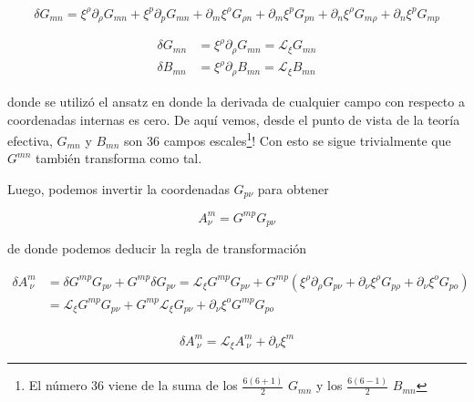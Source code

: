 \documentclass{article}
\numberwithin{equation}{section}
\begin{document}
\begin{equation*}
\delta G_{m n} = \xi^{\rho} \partial_{\rho} G_{m n} + \xi^p \partial_p G_{m n} + \partial_m \xi^{\rho} G_{\rho n} + \partial_m \xi^p G_{p n} + \partial_n \xi^{\rho} G_{m \rho} + \partial_n \xi^p G_{m p}
\end{equation*}
\begin{boxquation}
\begin{equation}\label{GyBscalars}
\begin{aligned}
\delta G_{m n} &= \xi^{\rho} \partial_{\rho} G_{m n} = \mathcal{L}_{\xi} G_{m n}\\
\delta B_{m n} &= \xi^{\rho} \partial_{\rho} B_{m n} = \mathcal{L}_{\xi} B_{m n}
\end{aligned}
\end{equation}
\end{boxquation}

donde se utilizó el ansatz en donde la derivada de cualquier campo con respecto a coordenadas internas es cero. De aquí vemos, desde el punto de vista de la teoría efectiva, $ G_{m n} $ y $ B_{m n} $ son 36 campos escales\footnote{ El número 36 viene de la suma de los $ \frac{6(6+1)}{2} $ $ G_{m n} $ y los $ \frac{6(6-1)}{2} $ $ B_{m n} $}! Con esto se sigue trivialmente que $ G^{m n} $ también transforma como tal.

Luego, podemos invertir la coordenadas $ G_{p \nu} $ para obtener

\begin{equation}
A^m_{\nu} = G^{m p} G_{p \nu}
\end{equation}

de donde podemos deducir la regla de transformación 

\begin{equation*}
\begin{aligned}
\delta A^m_{\ \nu} &= \delta G^{m p} G_{p \nu} + G^{m p} \delta G_{p \nu} = \mathcal{L}_{\xi} G^{m p} G_{p \nu} + G^{m p} \left( \xi^{\rho} \partial_{\rho} G_{p \nu} + \partial_{\nu} \xi^{\rho} G_{p \rho} + \partial_{\nu} \xi^{o} G_{p o} \right)\\
&=\mathcal{L}_{\xi} G^{m p} G_{p \nu} + G^{m p} \mathcal{L}_{\xi} G_{p \nu} + \partial_{\nu} \xi^{o} G^{m p} G_{p o}\\
\end{aligned}
\end{equation*}

\begin{boxquation}
	\begin{equation}\label{A}
	\delta A^m_{\ \nu}= \mathcal{L}_{\xi} A^m_{\ \nu} + \partial_{\nu} \xi^m
	\end{equation}
\end{boxquation}
\end{document}
